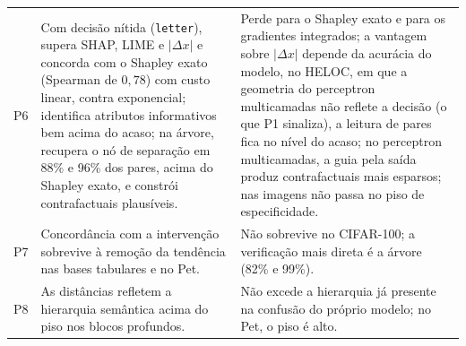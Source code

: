 \begin{table}[pos=htbp]
\begin{tabular}{p{0.7cm}p{5.4cm}p{7.2cm}}
P6 & Com decisão nítida (\texttt{letter}), supera SHAP, LIME e $|\Delta x|$ e concorda com o Shapley exato (Spearman de $0{,}78$) com custo linear, contra exponencial; identifica atributos informativos bem acima do acaso; na árvore, recupera o nó de separação em 88\% e 96\% dos pares, acima do Shapley exato, e constrói contrafactuais plausíveis. & Perde para o Shapley exato e para os gradientes integrados; a vantagem sobre $|\Delta x|$ depende da acurácia do modelo, no HELOC, em que a geometria do perceptron multicamadas não reflete a decisão (o que P1 sinaliza), a leitura de pares fica no nível do acaso; no perceptron multicamadas, a guia pela saída produz contrafactuais mais esparsos; nas imagens não passa no piso de especificidade. \\
P7 & Concordância com a intervenção sobrevive à remoção da tendência nas bases tabulares e no Pet. & Não sobrevive no CIFAR-100; a verificação mais direta é a árvore (82\% e 99\%). \\
P8 & As distâncias refletem a hierarquia semântica acima do piso nos blocos profundos. & Não excede a hierarquia já presente na confusão do próprio modelo; no Pet, o piso é alto. \\
\hline
\end{tabular}
\end{table}
